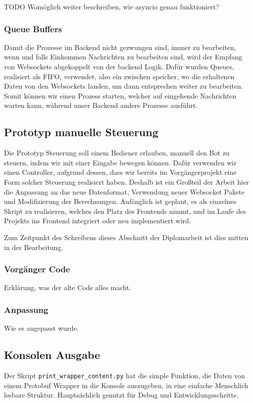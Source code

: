 TODO Womöglich weiter beschreiben, wie asyncio genau funktioniert?

\subsubsection{Queue Buffers}
Damit die Prozesse im Backend nicht gezwungen sind, immer zu bearbeiten, 
wenn und falls Einkommen Nachrichten zu bearbeiten sind, 
wird der Empfang von Websockets abgekoppelt von der backend Logik.
Dafür wurden Queues, realisiert als FIFO, verwendet, also ein zwischen speicher, 
wo die erhaltenen Daten von den Websockets landen, 
um dann entsprechen weiter zu bearbeiten.
% 
Somit können wir einen Prozess starten, 
welcher auf eingehende Nachrichten warten kann,
während unser Backend andere Prozesse ausführt.

\subsection{Prototyp manuelle Steuerung}
Die Prototyp Steuerung soll einem Bediener erlauben, manuell den Bot zu steuern,
indem wir mit einer Eingabe bewegen können. 
% 
Dafür verwenden wir einen Controller, 
aufgrund dessen, dass wir bereits im Vorgängerprojekt
eine Form solcher Steuerung realisiert haben. 
Deshalb ist ein Großteil der Arbeit hier die Anpassung an das neue Datenformat, 
Verwendung neuer Websocket Pakete und Modifizierung der Berechnungen.
% 
Anfänglich ist geplant, es als einzelnes Skript zu realisieren, 
welches den Platz des Frontends nimmt, 
und im Laufe des Projekts ins Frontend integriert oder neu implementiert wird.

Zum Zeitpunkt des Schreibens dieses Abschnitt der Diplomarbeit 
ist dies mitten in der Bearbeitung.
\subsubsection{Vorgänger Code}
Erklärung, was der alte Code alles macht.
\subsubsection{Anpassung}
Wie es angepasst wurde.

\subsection{Konsolen Ausgabe}
Der Skript \texttt{print\_wrapper\_content.py} hat die simple Funktion, 
die Daten von einem Protobuf Wrapper in die Konsole auszugeben, 
in eine einfache Menschlich lesbare Struktur. 
Hauptsächlich genutzt für Debug und Entwicklungsschritte.

